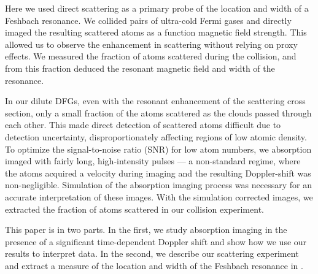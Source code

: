 \documentclass[12pt]{iopart}
\begin{document}
\par Here we used direct scattering as a primary probe of the location and width of a Feshbach resonance. We collided pairs of ultra-cold Fermi gases and directly imaged the resulting \swave{} scattered atoms as a function magnetic field strength. This allowed us to observe the enhancement in scattering without relying on proxy effects. We measured the fraction of atoms scattered during the collision, and from this fraction deduced the resonant magnetic field  and width of the resonance.

In our dilute DFGs, even with the resonant enhancement of the scattering cross section, only a small fraction of the atoms scattered as the clouds passed through each other. This made direct detection of scattered atoms difficult due to detection uncertainty, disproportionately affecting regions of low atomic density. To optimize the signal-to-noise ratio (SNR) for low atom numbers, we absorption imaged with fairly long, high-intensity pulses --- a non-standard regime, where the atoms acquired a velocity during imaging and the resulting Doppler-shift was non-negligible.  Simulation of the absorption imaging process was necessary for an accurate interpretation of these images. With the simulation corrected images, we extracted the fraction of atoms scattered in our collision experiment.

This paper is in two parts. In the first, we study absorption imaging in the presence of a significant time-dependent Doppler shift and show how we use our results to interpret data. In the second, we describe our \swave{} scattering experiment and extract a measure of the location and width of the Feshbach resonance in \K{}.
\end{document}
